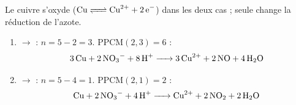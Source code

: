 \documentclass[11pt,a4paper]{article}
\begin{document}
\begin{corrige}
Le cuivre s'oxyde ($\ce{Cu <=> Cu^{2+} + 2 e^-}$) dans les deux cas ; seule change la réduction de
l'azote.
\begin{enumerate}[label=\alph*)]
  \item {}$\to$ : $n=5-2=3$. PPCM$(2,3)=6$ :
        \[\ce{3 Cu + 2 NO3^- + 8 H+ -> 3 Cu^{2+} + 2 NO + 4 H2O}\]
  \item {}$\to$ : $n=5-4=1$. PPCM$(2,1)=2$ :
        \[\ce{Cu + 2 NO3^- + 4 H+ -> Cu^{2+} + 2 NO2 + 2 H2O}\]
\end{enumerate}
\end{corrige}
\end{document}
